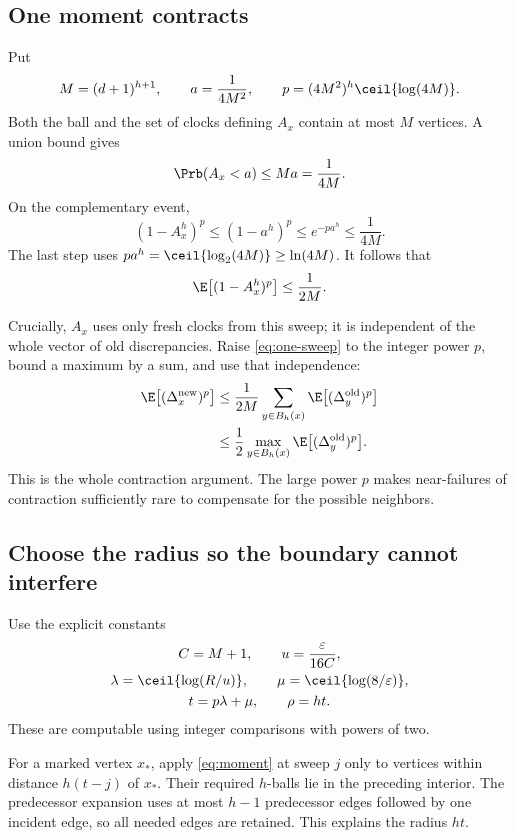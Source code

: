 \subsection{One moment contracts}

Put
\[
M=(d+1)^{h+1},\qquad
a=\frac1{4M^2},\qquad
p=(4M^2)^h\ceil{\log(4M)}.
\]
Both the ball and the set of clocks defining \(A_x\) contain at most \(M\) vertices. A union bound gives
\[
\Prb(A_x<a)\le Ma=\frac1{4M}.
\]
On the complementary event,
\[
(1-A_x^h)^p\le(1-a^h)^p
\le e^{-pa^h}
\le\frac1{4M}.
\]
The last step uses \(pa^h=\ceil{\log_2(4M)}\ge\ln(4M)\). It follows that
\[
\E\bigl[(1-A_x^h)^p\bigr]\le\frac1{2M}.
\]

Crucially, \(A_x\) uses only fresh clocks from this sweep; it is independent of the whole vector of old discrepancies. Raise \eqref{eq:one-sweep} to the integer power \(p\), bound a maximum by a sum, and use that independence:
\begin{align}
\E\bigl[(\Delta_x^{\rm new})^p\bigr]
&\le\frac1{2M}
   \sum_{y\in B_h(x)}\E\bigl[(\Delta_y^{\rm old})^p\bigr]\nonumber\\
&\le\frac12\max_{y\in B_h(x)}
                  \E\bigl[(\Delta_y^{\rm old})^p\bigr].\label{eq:moment}
\end{align}
This is the whole contraction argument. The large power \(p\) makes near-failures of contraction sufficiently rare to compensate for the possible neighbors.

\subsection{Choose the radius so the boundary cannot interfere}

Use the explicit constants
\begin{gather*}
C=M+1,\qquad u=\frac{\varepsilon}{16C},\\
\lambda=\ceil{\log(R/u)},\qquad
\mu=\ceil{\log(8/\varepsilon)},\\
t=p\lambda+\mu,\qquad \rho=ht.
\end{gather*}
These are computable using integer comparisons with powers of two.

For a marked vertex \(x_*\), apply \eqref{eq:moment} at sweep \(j\) only to vertices within distance \(h(t-j)\) of \(x_*\). Their required \(h\)-balls lie in the preceding interior. The predecessor expansion uses at most \(h-1\) predecessor edges followed by one incident edge, so all needed edges are retained. This explains the radius \(ht\).

